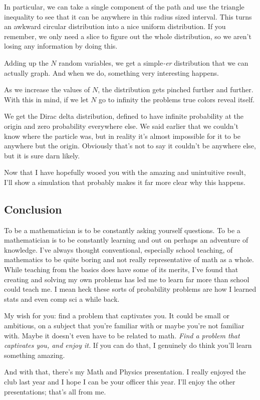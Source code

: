 In particular, we can take a single component of the path and use the triangle
inequality to see that it can be anywhere in this radius sized interval. This
turns an awkward circular distribution into a nice uniform distribution. If you
remember, we only need a slice to figure out the whole distribution, so we
aren't losing any information by doing this.

Adding up the \( N \) random variables, we get a simple\textit{-er}
distribution that we can actually graph. And when we do, something very
interesting happens.

As we increase the values of \( N \), the distribution gets pinched further and
further. With this in mind, if we let \( N \) go to infinity the problems true
colors reveal itself.

We get the Dirac delta distribution, defined to have infinite probability at
the origin and zero probability everywhere else. We said earlier that we
couldn't know where the particle was, but in reality it's almost impossible for
it to be anywhere but the origin. Obviously that's not to say it couldn't be
anywhere else, but it is sure darn likely.

Now that I have hopefully wooed you with the amazing and unintuitive result,
I'll show a simulation that probably makes it far more clear why this happens.

\subsection*{Conclusion}

To be a mathematician is to be constantly asking yourself questions. To be a
mathematician is to be constantly learning and out on perhaps an adventure of
knowledge. I've always thought conventional, especially school teaching, of
mathematics to be quite boring and not really representative of math as a whole. While
teaching from the basics does have some of its merits, I've found that creating
and solving my own problems has led me to learn far more than school could
teach me. I mean heck these sorts of probability problems are how I learned
stats and even comp sci a while back.

My wish for you: find a problem that captivates you. It could be small or
ambitious, on a subject that you're familiar with or maybe you're not familiar
with. Maybe it doesn't even have to be related to math. \textit{Find a problem that
captivates you, and enjoy it.} If you can do that, I genuinely do think you'll
learn something amazing.

And with that, there's my Math and Physics presentation. I really enjoyed the
club last year and I hope I can be your officer this year. I'll enjoy the other
presentations; that's all from me.
